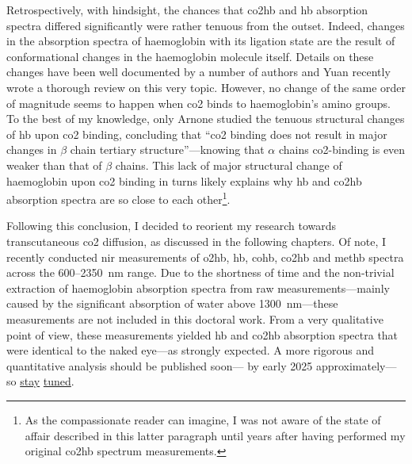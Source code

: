 Retrospectively, with hindsight, the chances that \gls{co2hb} and \gls{hb} absorption spectra differed significantly were rather tenuous from the outset. Indeed, changes in the absorption spectra of haemoglobin with its ligation state are the result of conformational changes in the haemoglobin molecule itself\cite{antonini1970}. Details on these changes have been well documented by a number of authors\cite{perutz1964, paoli1996, park2006hb, bringas2017} and Yuan \etal{} recently wrote a thorough review on this very topic\cite{yuan2015}. However, no change of the same order of magnitude seems to happen when \gls{co2} binds to haemoglobin's amino groups. To the best of my knowledge, only Arnone \etal{} studied the tenuous structural changes of \gls{hb} upon \gls{co2} binding, concluding that \enquote{\gls{co2} binding does not result in major changes in $\beta$ chain tertiary structure}\cite{arnone1980}---knowing that $\alpha$ chains \gls{co2}-binding is even weaker than that of $\beta$ chains. This lack of major structural change of haemoglobin upon \gls{co2} binding in turns likely explains why \gls{hb} and \gls{co2hb} absorption spectra are so close to each other\footnote{As the compassionate reader can imagine, I was not aware of the state of affair described in this latter paragraph until years after having performed my original \gls{co2hb} spectrum measurements.}.

Following this conclusion, I decided to reorient my research towards transcutaneous \gls{co2} diffusion, as discussed in the following chapters. Of note, I recently conducted \gls{nir} measurements of \gls{o2hb}, \gls{hb}, \gls{cohb}, \gls{co2hb} and \gls{methb} spectra across the 600--2350~nm range. Due to the shortness of time and the non-trivial extraction of haemoglobin absorption spectra from raw measurements---mainly caused by the significant absorption of water above 1300~nm---these measurements are not included in this doctoral work. From a very qualitative point of view, these measurements yielded \gls{hb} and \gls{co2hb} absorption spectra that were identical to the naked eye---as strongly expected. A more rigorous and quantitative analysis should be published soon---\ie{} by early 2025 approximately---so \href{https://wayback-api.archive.org/web/20240612134342/https://scholar.google.fr/citations?user=DCR_h9YAAAAJ&hl=fr}{stay} \href{https://wayback-api.archive.org/web/20240612134527/https://www.researchgate.net/profile/Emmanuel-Dervieux-2}{tuned}.